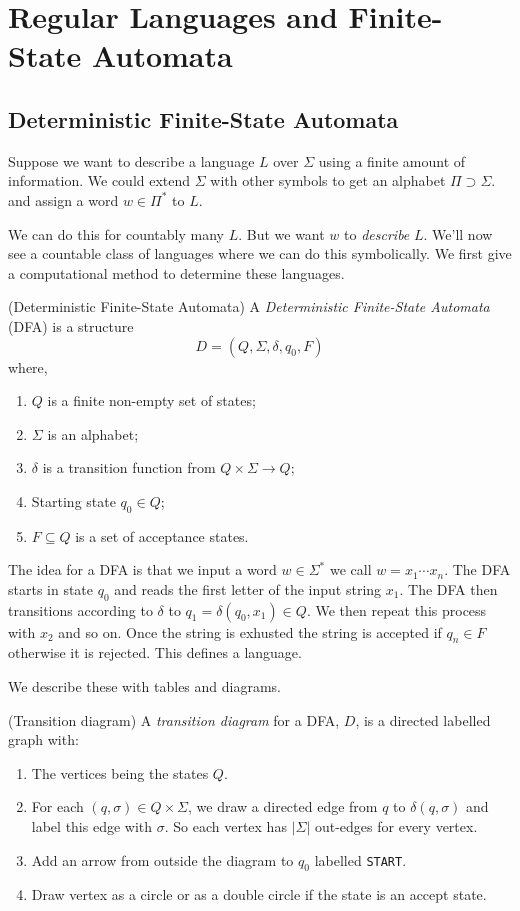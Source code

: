 \documentclass[tikx, border = 10pt]{article}
\begin{document}
\section{Regular Languages and Finite-State Automata}
\subsection{Deterministic Finite-State Automata}
\begin{remark}
	Suppose we want to describe a language $ L $ over $ \Sigma $ using a finite amount of information. We could extend $ \Sigma $ with other symbols to get an alphabet $ \Pi \supset \Sigma $. and assign a word $ w\in\Pi^* $ to $ L $.
\end{remark}
We can do this for countably many $ L $. But we want $ w $ to \textit{describe} $ L $. We'll now see a countable class of languages where we can do this symbolically. We first give a computational method to determine these languages.
\begin{definition}
	(Deterministic Finite-State Automata) A \textit{Deterministic Finite-State Automata} (DFA) is a structure
	\[
	  D = (Q,\Sigma, \delta, q_0, F)
	\]
	where,
	\begin{enumerate}
		\item $ Q $ is a finite non-empty set of states;
		\item $ \Sigma $ is an alphabet;
		\item $ \delta $ is a transition function from $ Q\times\Sigma \to Q $;
		\item Starting state $ q_0\in Q $;
		\item $ F\subseteq Q $ is a set of acceptance states.
	\end{enumerate}
\end{definition}
The idea for a DFA is that we input a word $ w\in \Sigma^* $ we call $ w = x_1\cdots x_n $. The DFA starts in state $ q_0 $ and reads the first letter of the input string $ x_1 $. The DFA then transitions according to $ \delta $ to $ q_1 = \delta(q_0,x_1)\in Q $. We then repeat this process with $ x_2 $ and so on. Once the string is exhusted the string is accepted if $ q_n\in F $ otherwise it is rejected. This defines a language.\par
We describe these with tables and diagrams.
\begin{definition}
	(Transition diagram) A \textit{transition diagram} for a DFA, $ D $, is a directed labelled graph with:
	\begin{enumerate}
		\item The vertices being the states $ Q $.
		\item For each $ (q,\sigma)\in Q\times \Sigma $, we draw a directed edge from $ q $ to $ \delta(q, \sigma) $ and label this edge with $ \sigma $. So each vertex has $ |\Sigma| $ out-edges for every vertex.
		\item Add an arrow from outside the diagram to $ q_0 $ labelled \verb&START&.
		\item Draw vertex as a circle or as a double circle if the state is an accept state.
	\end{enumerate}
\end{definition}
\end{document}
